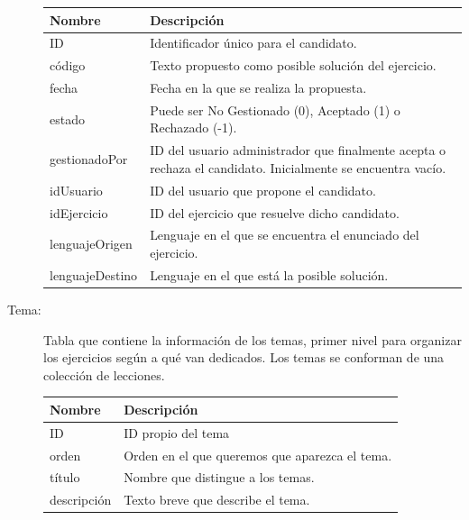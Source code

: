 \begin{description}
\begin{tabularx}{14cm}{|l|X|}
\hline
\textbf{Nombre} & \textbf{Descripción}                                                              \\ \hline
ID              & Identificador único para el candidato.                                         \\ \hline
código        & Texto propuesto como posible solución del ejercicio. \\ \hline
fecha      & Fecha en la que se realiza la propuesta. \\ \hline
estado              & Puede ser No Gestionado (0), Aceptado (1) o Rechazado (-1).                                         \\ \hline
gestionadoPor        & ID del usuario administrador que finalmente acepta o rechaza el candidato. Inicialmente se encuentra vacío. \\ \hline
idUsuario      & ID del usuario que propone el candidato. \\ \hline
idEjercicio              & ID del ejercicio que resuelve dicho candidato.                                         \\ \hline
lenguajeOrigen        & Lenguaje en el que se encuentra el enunciado del ejercicio. \\ \hline
lenguajeDestino      & Lenguaje en el que está la posible solución. \\ \hline
\end{tabularx}

\item[Tema:] Tabla que contiene la información de los temas, primer nivel para organizar los ejercicios según a qué van dedicados. Los temas se conforman de una colección de lecciones.

\begin{tabularx}{14cm}{|l|X|}
\hline
\textbf{Nombre} & \textbf{Descripción}                                                              \\ \hline
ID       & ID propio del tema                                                           \\ \hline
orden     & Orden en el que queremos que aparezca el tema.                                           \\ \hline
título            & Nombre que distingue a los temas. \\ \hline
descripción            & Texto breve que describe el tema. \\ \hline
\end{tabularx}


\end{description}
